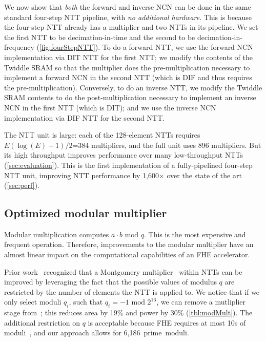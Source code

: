 We now show that \emph{both} the forward and inverse NCN can be done in the same standard four-step NTT pipeline, with \emph{no additional hardware}. This is because the four-step NTT already has a multiplier and two NTTs in its pipeline. We set the first NTT to be decimation-in-time and the second to be decimation-in-frequency (\autoref{fig:fourStepNTT}). To do a forward NTT, we use the forward NCN implementation via DIT NTT for the first NTT; we modify the contents of the Twiddle SRAM so that the multiplier does the pre-multiplication necessary to implement a forward NCN in the second NTT (which is DIF and thus requires the pre-multiplication). Conversely, to do an inverse NTT, we modify the Twiddle SRAM contents to do the post\hyp{}mul\-ti\-pli\-ca\-tion necessary to implement an inverse NCN in the first NTT (which is DIT); and we use the inverse NCN imple\-men\-ta\-tion via DIF NTT for the second NTT.

The NTT unit is large: each of the 128-element NTTs requires $E(\log (E)-1)/2$=384 multipliers,
and the full unit uses 896 multipliers.
But its high throughput improves performance over many low-throughput NTTs (\autoref{sec:evaluation}). %
This is the first implementation of a fully-pipelined four-step NTT unit, 
improving NTT performance by 1,600$\times$ over the state of the art (\autoref{sec:perf}).


\subsection{Optimized modular multiplier}\label{sec:modMult}
\tblModMult

Modular multiplication computes $a\cdot b \textrm{ mod } q$.
This is the most expensive and frequent operation.
Therefore, improvements to the modular multiplier have an almost
linear impact on the computational capabilities of an FHE accelerator.

Prior work~\cite{mert:euromicro19:design}
recognized that a Montgomery multiplier~\cite{montgomery:mom85:modular} within NTTs can be improved by leveraging
the fact that the possible values of modulus $q$ are restricted by the number of elements the NTT is applied to.
We notice that if we only select moduli $q_i$, such that $q_i = -1 \textrm{ mod } 2^{16}$,
we can remove a mutliplier stage from~\cite{mert:euromicro19:design};
this reduces area by 19\% and power by 30\% (\autoref{tbl:modMult}).
The additional restriction on $q$ is acceptable because FHE
requires at most 10s of moduli~\cite{gentry:crypto2012:homomorphic},
and our approach allows for 6,186~prime~moduli.

